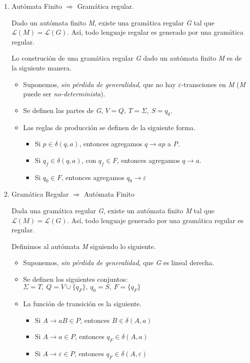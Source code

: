 \begin{enumerate}
  \item Autómata Finito $\Longrightarrow$ Gramática regular.

    Dado un autómata finito \textit{M}, existe una gramática regular \textit{G} tal que $\mathcal L(M) = \mathcal L(G)$. Asî, todo lenguaje regular es generado por una gramática regular.

    \newpara
    Lo construción de una gramática regular \textit{G} dado un autómata finito \textit{M} es de la siguiente manera.

    \begin{itemize}
      \item Suponemos, \textit{sin pérdida de generalidad}, que no hay $\varepsilon$-transciones en \textit{M} (\textit{M} puede ser \textit{no-determinista}).
      \item Se definen las partes de \textit{G}, $V = Q,~ T = \Sigma, ~ S = q_0$.
      \item Las reglas de producción se definen de la siguiente forma.
        \begin{itemize}
          \item Si $p \in \delta(q,a)$, entonces agregamos $q \rightarrow ap$ a \textit{P}.
          \item Si $q_f \in \delta(q,a)$, con $q_f \in F$, entonces agregamos $q \rightarrow a$.
          \item Si $q_0 \in F$, entonces agregamos $q_0 \rightarrow \varepsilon$
        \end{itemize}
    \end{itemize}

  \item Gramática Regular $\Longrightarrow$ Autómata Finito

    Dada una gramática regular \textit{G}, existe un autómata finito \textit{M} tal que $\mathcal L(M) = \mathcal L(G)$. Así, todo lenguaje generado por una gramática regular es regular.

    \newpara
    Definimos al autómata \textit{M} siguiendo lo siguiente.

    \begin{itemize}
      \item Suponemos, \textit{sin pérdida de generalidad}, que \textit{G} es lineal derecha.
      \item Se definen los siguientes conjuntos: $\Sigma = T,~ Q = V \cup \{q_F\}, ~ q_0 = S,~ F = \{q_F\}$
      \item La función de transición es la siguiente.
        \begin{itemize}
          \item Si $A \rightarrow aB \in P$, entonces $B \in \delta(A,a)$
          \item Si $A \rightarrow a \in P$, entonces $q_F \in \delta(A,a)$
          \item Si $A \rightarrow \varepsilon \in P$, entonces $q_F \in \delta(A,\varepsilon)$
        \end{itemize}
    \end{itemize}
\end{enumerate}

